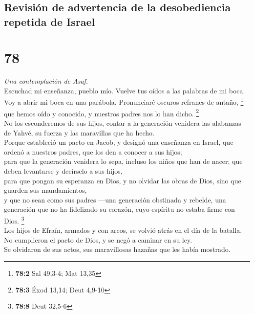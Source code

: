 \hypertarget{revisiuxf3n-de-advertencia-de-la-desobediencia-repetida-de-israel}{%
\subsection{Revisión de advertencia de la desobediencia repetida de
Israel}\label{revisiuxf3n-de-advertencia-de-la-desobediencia-repetida-de-israel}}

\hypertarget{section-76}{%
\section{78}\label{section-76}}

\emph{Una contemplación de Asaf.}\\
 Escuchad mi enseñanza, pueblo mío. Vuelve tus oídos a las
palabras de mi boca.\\
 Voy a abrir mi boca en una parábola. Pronunciaré oscuros
refranes de antaño, \footnote{\textbf{78:2} Sal 49,3-4; Mat 13,35}\\
 que hemos oído y conocido, y nuestros padres nos lo han
dicho. \footnote{\textbf{78:3} Éxod 13,14; Deut 4,9-10}\\
 No los esconderemos de sus hijos, contar a la generación
venidera las alabanzas de Yahvé, su fuerza y las maravillas que ha
hecho.\\
 Porque estableció un pacto en Jacob, y designó una
enseñanza en Israel, que ordenó a nuestros padres, que los den a conocer
a sus hijos;\\
 para que la generación venidera lo sepa, incluso los
niños que han de nacer; que deben levantarse y decírselo a sus hijos,\\
 para que pongan su esperanza en Dios, y no olvidar las
obras de Dios, sino que guarden sus mandamientos,\\
 y que no sean como sus padres ---una generación obstinada
y rebelde, una generación que no ha fidelizado su corazón, cuyo espíritu
no estaba firme con Dios. \footnote{\textbf{78:8} Deut 32,5-6}\\
 Los hijos de Efraín, armados y con arcos, se volvió atrás
en el día de la batalla.\\
 No cumplieron el pacto de Dios, y se negó a caminar en
su ley.\\
 Se olvidaron de sus actos, sus maravillosas hazañas que
les había mostrado.\\
